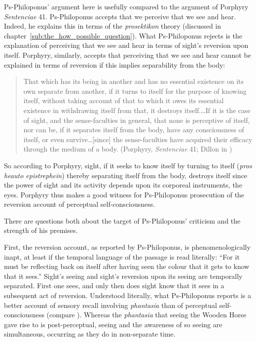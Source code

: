 Ps-Philoponus' argument here is usefully compared to the argument of Porphyry \emph{Sentenciae} 41. Ps-Philoponus accepts that we perceive that we see and hear. Indeed, he explains this in terms of the \emph{prosektikon} theory (discussed in chapter~\ref{sub:the_how_possible_question}). What Ps-Philoponus rejects is the explanation of perceiving that we see and hear in terms of sight's reversion upon itself. Porphyry, similarly, accepts that perceiving that we see and hear cannot be explained in terms of reversion if this implies separability from the body:
\begin{quote}
	That which has its being in another and has no essential existence on its own separate from another, if it turns to itself for the purpose of knowing itself, without taking account of that to which it owes its essential existence in withdrawing itself from that, it destroys itself.\ldots If it is the case of sight, and the sense-faculties in general, that none is perceptive of itself, nor can be, if it separates itself from the body, have any consciousness of itself, or even survive\ldots [since] the sense-faculties have acquired their efficacy through the medium of a body. (Porphyry, \emph{Sentenciae} 41; Dillon in \citealt[829]{Brisson:2005qr})
\end{quote}
So according to Porphyry, sight, if it seeks to know itself by turning to itself (\emph{pros heauto epistrephein}) thereby separating itself from the body, destroys itself since the power of sight and its activity depends upon its corporeal instruments, the eyes. Porphyry thus makes a good witness for Ps-Philoponus prosecution of the reversion account of perceptual self-consciousness.

There are questions both about the target of Ps-Philoponus' criticism and the strength of his premises.

First, the reversion account, as reported by Ps-Philoponus, is phenomenologically inapt, at least if the temporal language of the passage is read literally: ``For it must be reflecting back on itself after having seen the colour that it gets to know that it sees.'' Sight's seeing and sight's reversion upon its seeing are temporally separated. First one sees, and only then does sight know that it sees in a subsequent act of reversion. Understood literally, what Ps-Philo\-po\-nus reports is a better account of sensory recall involving \emph{phantasia} than of perceptual self-consciousness (compare \citealt[18–9]{Zahavi:1999aa}). Whereas the \emph{phantasia} that seeing the Wooden Horse gave rise to is post-perceptual, seeing and the awareness of so seeing are simultaneous, occurring as they do in non-separate time. 

